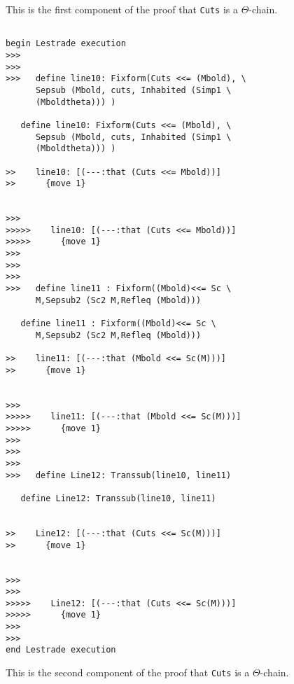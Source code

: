 \documentclass[12pt]{article}
\begin{document}
This is the first component of the proof that {\tt Cuts} is a $\Theta$-chain.

\begin{verbatim}

begin Lestrade execution
>>>
>>>
>>>   define line10: Fixform(Cuts <<= (Mbold), \
      Sepsub (Mbold, cuts, Inhabited (Simp1 \
      (Mboldtheta))) )

   define line10: Fixform(Cuts <<= (Mbold), \
      Sepsub (Mbold, cuts, Inhabited (Simp1 \
      (Mboldtheta))) )

>>    line10: [(---:that (Cuts <<= Mbold))]
>>      {move 1}


>>>
>>>>>    line10: [(---:that (Cuts <<= Mbold))]
>>>>>      {move 1}
>>>
>>>
>>>
>>>   define line11 : Fixform((Mbold)<<= Sc \
      M,Sepsub2 (Sc2 M,Refleq (Mbold)))

   define line11 : Fixform((Mbold)<<= Sc \
      M,Sepsub2 (Sc2 M,Refleq (Mbold)))

>>    line11: [(---:that (Mbold <<= Sc(M)))]
>>      {move 1}


>>>
>>>>>    line11: [(---:that (Mbold <<= Sc(M)))]
>>>>>      {move 1}
>>>
>>>
>>>
>>>   define Line12: Transsub(line10, line11)

   define Line12: Transsub(line10, line11)


>>    Line12: [(---:that (Cuts <<= Sc(M)))]
>>      {move 1}


>>>
>>>
>>>>>    Line12: [(---:that (Cuts <<= Sc(M)))]
>>>>>      {move 1}
>>>
>>>
end Lestrade execution
\end{verbatim}

This is the second component of the proof that {\tt Cuts} is a $\Theta$-chain.
\end{document}
